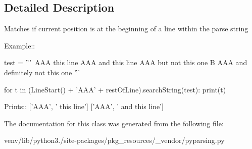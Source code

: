 \subsection{Detailed Description}
\begin{DoxyVerb}Matches if current position is at the beginning of a line within the parse string

Example::

    test = '''\
    AAA this line
    AAA and this line
      AAA but not this one
    B AAA and definitely not this one
    '''

    for t in (LineStart() + 'AAA' + restOfLine).searchString(test):
        print(t)

Prints::
    ['AAA', ' this line']
    ['AAA', ' and this line']    \end{DoxyVerb}
 

The documentation for this class was generated from the following file\+:\begin{DoxyCompactItemize}
\item 
venv/lib/python3./site-\/packages/pkg\+\_\+resources/\+\_\+vendor/pyparsing.\+py\end{DoxyCompactItemize}
